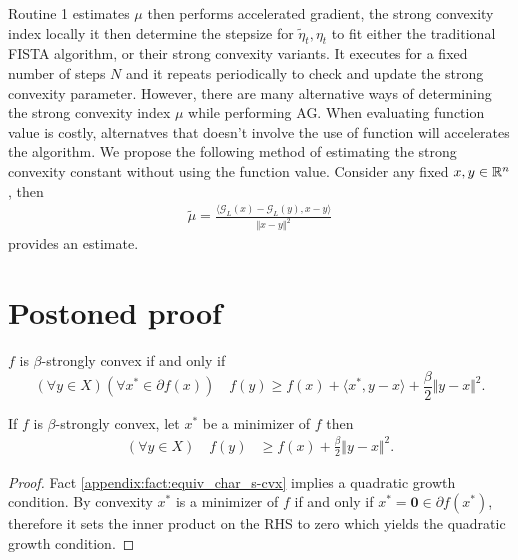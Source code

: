 \documentclass[12pt]{article}
\begin{document}
        Routine 1 estimates $\mu$ then performs accelerated gradient, the strong convexity index locally it then determine the stepsize for $\tilde \eta_t, \eta_t$ to fit either the traditional FISTA algorithm, or their strong convexity variants. 
        It executes for a fixed number of steps $N$ and it repeats periodically to check and update the strong convexity parameter. 
        However, there are many alternative ways of determining the strong convexity index $\mu$ while performing AG. 
        When evaluating function value is costly, alternatves that doesn't involve the use of function will accelerates the algorithm. 
        We propose the following method of estimating the strong convexity constant without using the function value. 
        Consider any fixed $x, y \in \mathbb R^n$, then 
        \begin{align*}
            \tilde \mu = 
            \frac{
                \langle \mathcal G_L(x) - \mathcal G_L(y), x - y\rangle
            }{\Vert x - y\Vert^2}
        \end{align*}
        provides an estimate. 
        
        
        



\section{Postoned proof}
    \begin{fact}
    \label{appendix:fact:equiv_char_s-cvx}
        $f$ is $\beta$-strongly convex if and only if
        $$
            (\forall y\in X)(\forall x^* \in \partial f(x))
            \quad f(y) \ge f(x) + \langle x^*, y - x\rangle +
            \frac{\beta}{2}\Vert y - x\Vert^2
            .
        $$
    \end{fact}

    \begin{theorem}\label{appendix:thm:q_growth}
        If $f$ is $\beta$-strongly convex, let $x^*$ be a minimizer of $f$ then 
        \begin{align*}
            (\forall y \in X) \quad 
            f(y) &\ge 
            f(x) + \frac{\beta}{2}\Vert y - x\Vert^2. 
        \end{align*}
    \end{theorem}
    \begin{proof}
        Fact \ref*{appendix:fact:equiv_char_s-cvx} 
        implies a quadratic growth condition. 
        By convexity $x^*$ is a minimizer of $f$ if and only if $x^*= \mathbf 0 \in \partial f(x^*)$, therefore it sets the inner product on the RHS to zero which yields the quadratic growth condition. 
    \end{proof}
\end{document}
